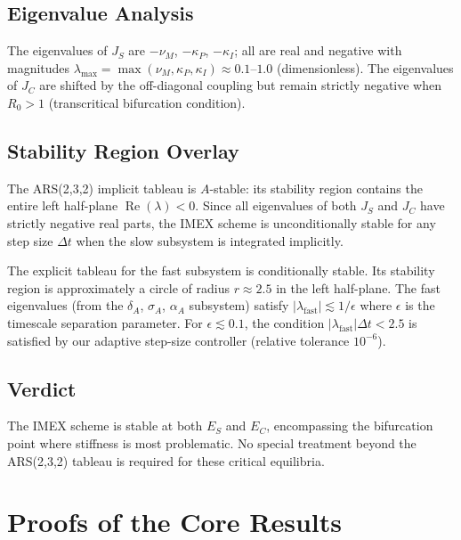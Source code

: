 \documentclass{article}
\theoremstyle{definition}
\begin{document}
\subsection{Eigenvalue Analysis}

The eigenvalues of $J_S$ are $-\nu_M$, $-\kappa_P$, $-\kappa_I$; all are
real and negative with magnitudes $\lambda_{\max} = \max(\nu_M, \kappa_P,
\kappa_I) \approx 0.1\text{--}1.0$ (dimensionless). The eigenvalues of
$J_C$ are shifted by the off-diagonal coupling but remain strictly
negative when $R_0 > 1$ (transcritical bifurcation condition).

\subsection{Stability Region Overlay}

The ARS(2,3,2) implicit tableau is $A$-stable: its stability region
contains the entire left half-plane $\operatorname{Re}(\lambda) < 0$.
Since all eigenvalues of both $J_S$ and $J_C$ have strictly negative
real parts, the IMEX scheme is unconditionally stable for any step size
$\Delta t$ when the slow subsystem is integrated implicitly.

The explicit tableau for the fast subsystem is conditionally stable.
Its stability region is approximately a circle of radius $r \approx
2.5$ in the left half-plane. The fast eigenvalues (from the
$\delta_A$, $\sigma_A$, $\alpha_A$ subsystem) satisfy
$|\lambda_{\text{fast}}| \lesssim 1/\epsilon$ where $\epsilon$ is
the timescale separation parameter. For $\epsilon \lesssim 0.1$,
the condition $|\lambda_{\text{fast}}|\Delta t < 2.5$ is satisfied
by our adaptive step-size controller (relative tolerance $10^{-6}$).

\subsection{Verdict}

The IMEX scheme is stable at both $E_S$ and $E_C$, encompassing the
bifurcation point where stiffness is most problematic.
No special treatment beyond the ARS(2,3,2) tableau is required for
these critical equilibria.


\clearpage
\section{Proofs of the Core Results}\label{app:proofs}
\end{document}
